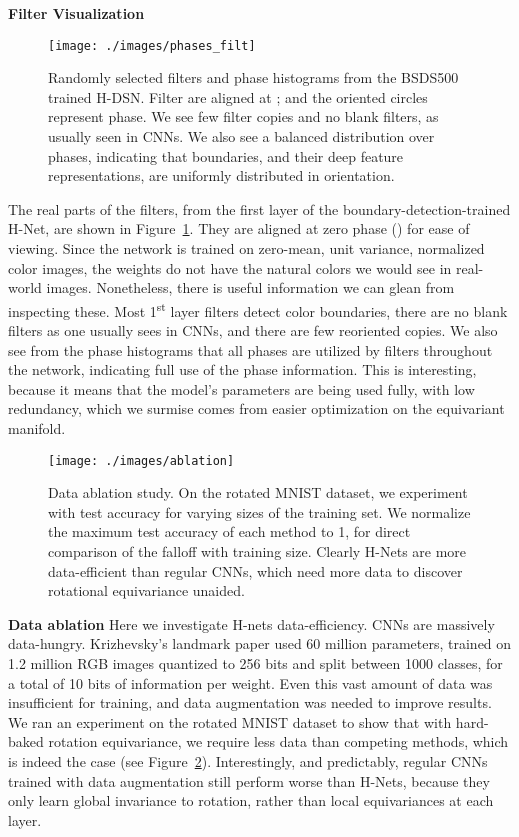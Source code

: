 \documentclass[10pt,twocolumn,letterpaper]{article}
\begin{document}
\textbf{Filter Visualization}
\begin{figure}[b]
	\texttt{[image: ./images/phases\_filt]}
    \caption{Randomly selected filters and phase histograms from the 
    BSDS500 trained H-DSN. Filter are aligned at ; and the 
    oriented circles represent phase. We see few filter copies and no
    blank filters, as usually seen in CNNs. We also see a balanced 
    distribution over phases, indicating that boundaries, and their 
    deep feature representations, are uniformly distributed in orientation.}
    \label{fig:layer1}
\vspace{-1em}
\end{figure}
The real parts of the filters, from the first layer of the 
boundary-detection-trained H-Net, are shown in Figure~\ref{fig:layer1}. 
They are aligned at zero phase () for ease of viewing. 
Since the network is trained on zero-mean, unit variance, normalized 
color images, the weights do not have the natural colors we would see 
in real-world images. Nonetheless, there is useful information we can 
glean from inspecting these. Most 1\textsuperscript{st} layer filters
detect color boundaries, there are no blank filters as one usually sees 
in CNNs, and there are few reoriented copies. We also see from the
phase histograms that all phases are utilized by filters throughout 
the network, indicating full use of the phase information. This is
interesting, because it means that the model's parameters are being
used fully, with low redundancy, which we surmise comes from easier
optimization on the equivariant manifold.
\begin{figure}[b]
\vspace{-1em}
	\texttt{[image: ./images/ablation]}
    \caption{Data ablation study. On the rotated MNIST dataset, we experiment
    with test accuracy for varying sizes of the training set. We normalize the
    maximum test accuracy of each method to 1, for direct comparison of the falloff with
    training size. Clearly H-Nets are more data-efficient than regular CNNs,
    which need more data to discover rotational equivariance unaided.}
    \label{fig:DataAblation}
\end{figure}

\textbf{Data ablation}
Here we investigate H-nets data-efficiency. CNNs are massively data-hungry. Krizhevsky's landmark paper \cite{krizhevsky2012imagenet} used 60 million parameters, trained on 1.2 million  RGB images quantized to 256 bits and split between 1000 classes, for a total of 10 bits of information per weight. Even this vast amount of data was insufficient for training, and data augmentation was needed to improve results. We ran an experiment on the rotated MNIST dataset to show that with hard-baked rotation equivariance, we require less data than competing methods, which is indeed the case (see Figure~\ref{fig:DataAblation}). Interestingly, and predictably, regular CNNs trained with data augmentation still perform worse than H-Nets, because they only learn global invariance to rotation, rather than local equivariances at each layer.
\end{document}
